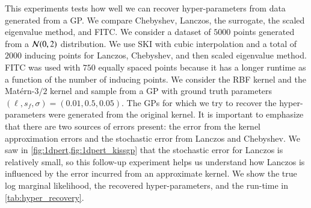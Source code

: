 This experiments tests how well we can recover hyper\hyp{}parameters from data
generated from a GP. We compare Chebyshev, Lanczos, the surrogate, the scaled
eigenvalue method, and FITC. We consider a dataset of $5000$ points generated
from a $\mathcal{N}(0,2)$ distribution. We use SKI with cubic interpolation and a
total of $2000$ inducing points for Lanczos, Chebyshev, and then scaled
eigenvalue method. FITC was used with $750$ equally spaced points because it has
a longer runtime as a function of the number of inducing points. We consider the
RBF kernel and the Mat\'ern\hyp{}$3/2$ kernel and sample from a GP with ground
truth parameters $(\ell,s_f,\sigma)=(0.01, 0.5, 0.05)$. The GPs for which we try
to recover the hyper\hyp{}parameters were generated from the original kernel. It
is important to emphasize that there are two sources of errors present: the
error from the kernel approximation errors and the stochastic error from Lanczos
and Chebyshev. We saw in \cref{fig:1dpert,fig:1dpert_kissgp} that the stochastic
error for Lanczos is relatively small, so this follow\hyp{}up experiment helps
us understand how Lanczos is influenced by the error incurred from an
approximate kernel. We show the true log marginal likelihood, the recovered
hyper\hyp{}parameters, and the run\hyp{}time in \cref{tab:hyper_recovery}.

